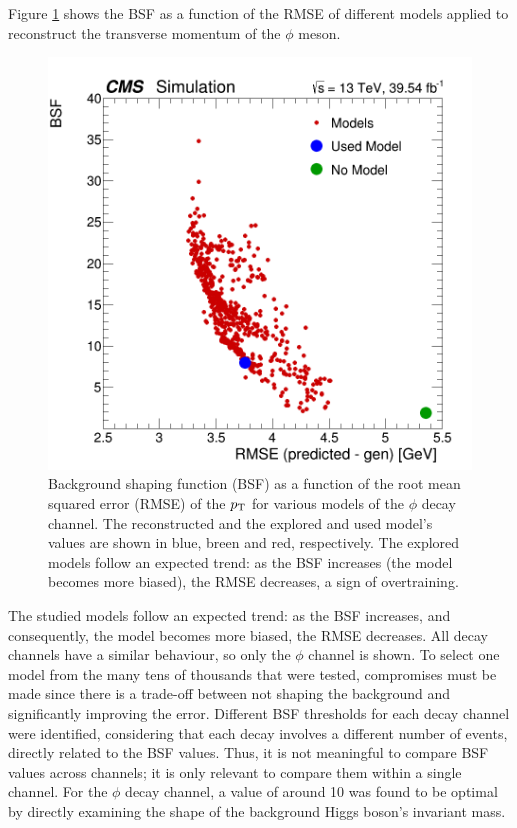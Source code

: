 Figure \ref{fig:BSF_vs_RMSE_phi} shows the BSF as a function of the RMSE of different models applied to reconstruct the transverse momentum of the $\phi$ meson.
\begin{figure}[!ht]
    \captionsetup[subfigure]{labelformat=empty}
    \vspace*{-0.2cm}
    \centering
    \setlength{\mylength}{\textwidth}
    \includegraphics[width=0.49\mylength]{resources/plots/BSF_vs_RMSE_phi.png}
    \caption{Background shaping function (BSF) as a function of the root mean squared error (RMSE) of the $p_\text{T}$ for various models of the $\phi$ decay channel. The reconstructed and the explored and used model's values are shown in blue, breen and red, respectively. The explored models follow an expected trend: as the BSF increases (the model becomes more biased), the RMSE decreases, a sign of overtraining.}
    \label{fig:BSF_vs_RMSE_phi}
    \vspace*{-0.0cm}
\end{figure}
The studied models follow an expected trend: as the BSF increases, and consequently, the model becomes more biased, the RMSE decreases. All decay channels have a similar behaviour, so only the $\phi$ channel is shown. To select one model from the many tens of thousands that were tested, compromises must be made since there is a trade-off between not shaping the background and significantly improving the error. Different BSF thresholds for each decay channel were identified, considering that each decay involves a different number of events, directly related to the BSF values. Thus, it is not meaningful to compare BSF values across channels; it is only relevant to compare them within a single channel. For the $\phi$ decay channel, a value of around 10 was found to be optimal by directly examining the shape of the background Higgs boson's invariant mass.

